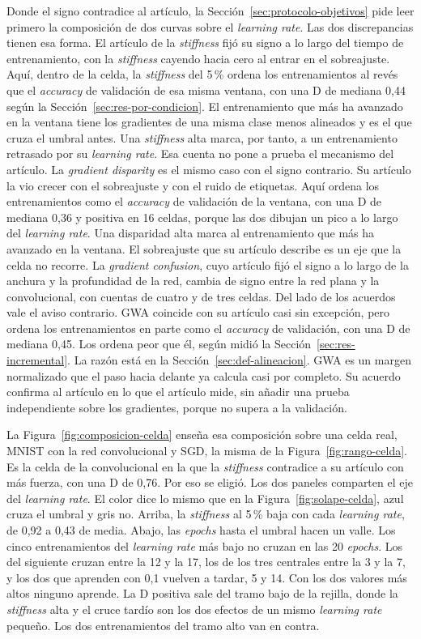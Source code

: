 Donde el signo contradice al artículo, la Sección~\ref{sec:protocolo-objetivos} pide leer primero la composición de dos curvas sobre el \emph{learning rate}. Las dos discrepancias tienen esa forma. El artículo de la \emph{stiffness} fijó su signo a lo largo del tiempo de entrenamiento, con la \emph{stiffness} cayendo hacia cero al entrar en el sobreajuste. Aquí, dentro de la celda, la \emph{stiffness} del 5\,\% ordena los entrenamientos al revés que el \emph{accuracy} de validación de esa misma ventana, con una D de mediana 0,44 según la Sección~\ref{sec:res-por-condicion}. El entrenamiento que más ha avanzado en la ventana tiene los gradientes de una misma clase menos alineados y es el que cruza el umbral antes. Una \emph{stiffness} alta marca, por tanto, a un entrenamiento retrasado por su \emph{learning rate}. Esa cuenta no pone a prueba el mecanismo del artículo. La \emph{gradient disparity} es el mismo caso con el signo contrario. Su artículo la vio crecer con el sobreajuste y con el ruido de etiquetas. Aquí ordena los entrenamientos como el \emph{accuracy} de validación de la ventana, con una D de mediana 0,36 y positiva en 16 celdas, porque las dos dibujan un pico a lo largo del \emph{learning rate}. Una disparidad alta marca al entrenamiento que más ha avanzado en la ventana. El sobreajuste que su artículo describe es un eje que la celda no recorre. La \emph{gradient confusion}, cuyo artículo fijó el signo a lo largo de la anchura y la profundidad de la red, cambia de signo entre la red plana y la convolucional, con cuentas de cuatro y de tres celdas. Del lado de los acuerdos vale el aviso contrario. GWA coincide con su artículo casi sin excepción, pero ordena los entrenamientos en parte como el \emph{accuracy} de validación, con una D de mediana 0,45. Los ordena peor que él, según midió la Sección~\ref{sec:res-incremental}. La razón está en la Sección~\ref{sec:def-alineacion}. GWA es un margen normalizado que el paso hacia delante ya calcula casi por completo. Su acuerdo confirma al artículo en lo que el artículo mide, sin añadir una prueba independiente sobre los gradientes, porque no supera a la validación.

La Figura~\ref{fig:composicion-celda} enseña esa composición sobre una celda real, MNIST con la red convolucional y SGD, la misma de la Figura~\ref{fig:rango-celda}. Es la celda de la convolucional en la que la \emph{stiffness} contradice a su artículo con más fuerza, con una D de 0,76. Por eso se eligió. Los dos paneles comparten el eje del \emph{learning rate}. El color dice lo mismo que en la Figura~\ref{fig:solape-celda}, azul cruza el umbral y gris no. Arriba, la \emph{stiffness} al 5\,\% baja con cada \emph{learning rate}, de 0,92 a 0,43 de media. Abajo, las \emph{epochs} hasta el umbral hacen un valle. Los cinco entrenamientos del \emph{learning rate} más bajo no cruzan en las 20 \emph{epochs}. Los del siguiente cruzan entre la 12 y la 17, los de los tres centrales entre la 3 y la 7, y los dos que aprenden con 0,1 vuelven a tardar, 5 y 14. Con los dos valores más altos ninguno aprende. La D positiva sale del tramo bajo de la rejilla, donde la \emph{stiffness} alta y el cruce tardío son los dos efectos de un mismo \emph{learning rate} pequeño. Los dos entrenamientos del tramo alto van en contra.


